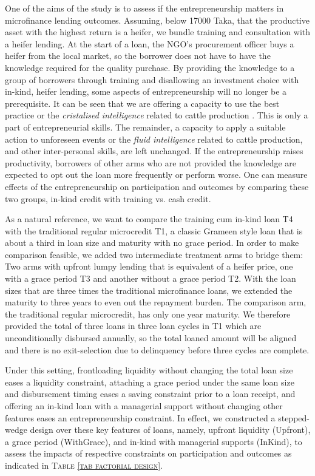 	One of the aims of the study is to assess if the entrepreneurship matters in microfinance lending outcomes. Assuming, below 17000 Taka, that the productive asset with the highest return is a heifer, we bundle training and consultation with a heifer lending. At the start of a loan, the NGO's procurement officer buys a heifer from the local market, so the borrower does not have to have the knowledge required for the quality purchase. By providing the knowledge to a group of borrowers through training and disallowing an investment choice with in-kind, heifer lending, some aspects of entrepreneurship will no longer be a prerequisite. It can be seen that we are offering a capacity to use the best practice or the \textit{cristalised intelligence} related to cattle production \citep{Cattell1963}. This is only a part of entrepreneurial skills. The remainder, a capacity to apply a suitable action to unforeseen events or the \textit{fluid intelligence} related to cattle production, and other inter-personal skills, are left unchanged. If the entrepreneurship raises productivity, borrowers of other arms who are not provided the knowledge are expected to opt out the loan more frequently or perform worse. One can measure effects of the entrepreneurship on participation and outcomes by comparing these two groups, in-kind credit with training vs. cash credit.

	As a natural reference, we want to compare the training cum in-kind loan \textsf{T4} with the traditional regular microcredit \textsf{T1}, a classic Grameen style loan that is about a third in loan size and maturity with no grace period. In order to make comparison feasible, we added two intermediate treatment arms to bridge them: Two arms with upfront lumpy lending that is equivalent of a heifer price, one with a grace period \textsf{T3} and another without a grace period \textsf{T2}. With the loan sizes that are three times the traditional microfinance loans, we extended the maturity to three years to even out the repayment burden. The comparison arm, the traditional regular microcredit, has only one year maturity. We therefore provided the total of three loans in three loan cycles in \textsf{T1} which are unconditionally disbursed annually, so the total loaned amount will be aligned and there is no exit-selection due to delinquency before three cycles are complete. 
	
	Under this setting, frontloading liquidity without changing the total loan size eases a liquidity constraint, attaching a grace period under the same loan size and disbursement timing eases a saving constraint prior to a loan receipt, and offering an in-kind loan with a managerial support without changing other features eases an entrepreneurship constraint. In effect, we constructed a stepped-wedge design over these key features of loans, namely, upfront liquidity (\textsf{Upfront}), a grace period (\textsf{WithGrace}), and in-kind with managerial supports (\textsf{InKind}), to assess the impacts of respective constraints on participation and outcomes as indicated in \textsc{\normalsize Table \ref{tab factorial design}}. 

